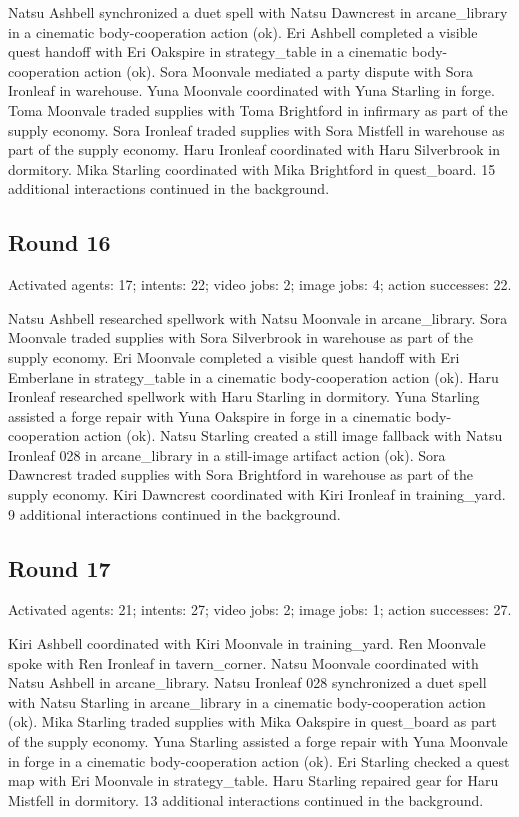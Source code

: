 \documentclass[11pt,a4paper]{article}
\begin{document}
Natsu Ashbell synchronized a duet spell with Natsu Dawncrest in arcane\_library in a cinematic body-cooperation action (ok). Eri Ashbell completed a visible quest handoff with Eri Oakspire in strategy\_table in a cinematic body-cooperation action (ok). Sora Moonvale mediated a party dispute with Sora Ironleaf in warehouse. Yuna Moonvale coordinated with Yuna Starling in forge. Toma Moonvale traded supplies with Toma Brightford in infirmary as part of the supply economy. Sora Ironleaf traded supplies with Sora Mistfell in warehouse as part of the supply economy. Haru Ironleaf coordinated with Haru Silverbrook in dormitory. Mika Starling coordinated with Mika Brightford in quest\_board. 15 additional interactions continued in the background.

\subsection{Round 16}
Activated agents: 17; intents: 22; video jobs: 2; image jobs: 4; action successes: 22.

Natsu Ashbell researched spellwork with Natsu Moonvale in arcane\_library. Sora Moonvale traded supplies with Sora Silverbrook in warehouse as part of the supply economy. Eri Moonvale completed a visible quest handoff with Eri Emberlane in strategy\_table in a cinematic body-cooperation action (ok). Haru Ironleaf researched spellwork with Haru Starling in dormitory. Yuna Starling assisted a forge repair with Yuna Oakspire in forge in a cinematic body-cooperation action (ok). Natsu Starling created a still image fallback with Natsu Ironleaf 028 in arcane\_library in a still-image artifact action (ok). Sora Dawncrest traded supplies with Sora Brightford in warehouse as part of the supply economy. Kiri Dawncrest coordinated with Kiri Ironleaf in training\_yard. 9 additional interactions continued in the background.

\subsection{Round 17}
Activated agents: 21; intents: 27; video jobs: 2; image jobs: 1; action successes: 27.

Kiri Ashbell coordinated with Kiri Moonvale in training\_yard. Ren Moonvale spoke with Ren Ironleaf in tavern\_corner. Natsu Moonvale coordinated with Natsu Ashbell in arcane\_library. Natsu Ironleaf 028 synchronized a duet spell with Natsu Starling in arcane\_library in a cinematic body-cooperation action (ok). Mika Starling traded supplies with Mika Oakspire in quest\_board as part of the supply economy. Yuna Starling assisted a forge repair with Yuna Moonvale in forge in a cinematic body-cooperation action (ok). Eri Starling checked a quest map with Eri Moonvale in strategy\_table. Haru Starling repaired gear for Haru Mistfell in dormitory. 13 additional interactions continued in the background.
\end{document}
